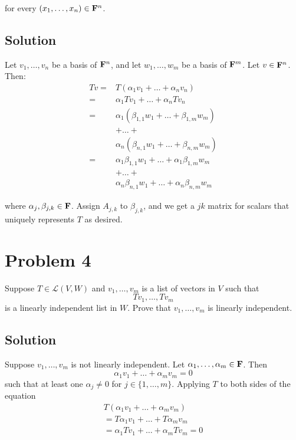 \documentclass{article}
\begin{document}
for every $(x_1,\ldots,x_n)\in\mathbf{F}^n$.

\subsection*{Solution}

Let $v_1,\ldots,v_n$ be a basis of $\mathbf{F}^n$, and let $w_1,\ldots,w_m$ be a basis of $\mathbf{F}^m$. Let $v\in\mathbf{F}^n$. Then:
\begin{align*}
    Tv = &T(\alpha_1v_1+\ldots+\alpha_n v_n)\\
    = &\alpha_1 T v_1+\ldots+\alpha_n T v_n\\
    = &\alpha_1 (\beta_{1, 1}w_1+\ldots+\beta_{1,m}w_m)\\
    &+\ldots+\\
    &\alpha_n (\beta_{n, 1}w_1+\ldots+\beta_{n,m}w_m)\\
    = &\alpha_1 \beta_{1, 1}w_1+\ldots+\alpha_1\beta_{1,m}w_m\\
    &+\ldots+\\
    &\alpha_n \beta_{n, 1}w_1+\ldots+\alpha_n\beta_{n,m}w_m
\end{align*}

where $\alpha_j,\beta_{j,k}\in\mathbf{F}$. Assign $A_{j,k}$ to $\beta_{j,k}$, and we get a $jk$ matrix for scalars that uniquely represents $T$ as desired.

\section*{Problem 4}

Suppose $T\in\mathcal{L}(V,W)$ and $v_1,\ldots,v_m$ is a list of vectors in $V$ such that
\[Tv_1, \ldots, Tv_m\]
is a linearly independent list in $W$. Prove that $v_1,\ldots,v_m$ is linearly independent.

\subsection*{Solution}
Suppose $v_1,\ldots,v_m$ is not linearly independent. Let $\alpha_1,\ldots,\alpha_m\in\mathbf{F}$. Then
\[\alpha_1 v_1 + \ldots + \alpha_m v_m=0\]
such that at least one $\alpha_j\neq 0$ for $j\in\{1,\ldots,m\}$. Applying $T$ to both sides of the equation
\begin{align*}
    T(\alpha_1 v_1 + \ldots + \alpha_m v_m)\\
    = T\alpha_1 v_1 + \ldots + T\alpha_m v_m\\
    = \alpha_1 Tv_1 + \ldots + \alpha_m Tv_m=0
\end{align*}
\end{document}
